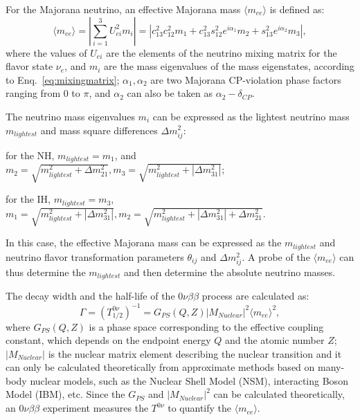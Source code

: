 For the Majorana neutrino, an effective Majorana mass $\langle m_{ee}\rangle$ is defined as\cite{suekane2015neutrino,zuber2020neutrino}:
\begin{equation}\label{eq:effective_nuMass}
\langle m_{ee}\rangle = |\sum_{i=1}^3 U^2_{ei}m_i|= |c^2_{13}c^2_{12}m_1+c^2_{13}s^2_{12}e^{i\alpha_1}m_2+s^2_{13}e^{i\alpha_2}m_3|,
\end{equation}
where the values of $U_{ei}$ are the elements of the neutrino mixing matrix for the flavor state $\nu_e$, and $m_i$ are the mass eigenvalues of the mass eigenstates, according to Enq.~\ref{eq:mixingmatrix}; $\alpha_1,\alpha_2$ are two Majorana CP-violation phase factors ranging from 0 to $\pi$, and $\alpha_2$ can also be taken as $\alpha_2-\delta_{CP}$.

The neutrino mass eigenvalues $m_i$ can be expressed as the lightest neutrino mass $m_{lightest}$ and mass square differences $\Delta m^2_{ij}$\cite{suekane2015neutrino}:

for the NH, $m_{lightest}=m_1$, and $m_2=\sqrt{m_{lightest}^2+\Delta m^2_{21}}, m_3 = \sqrt{m_{lightest}^2+|\Delta m^2_{31}|}$;

for the IH, $m_{lightest}=m_3$, $m_1=\sqrt{m_{lightest}^2+|\Delta m^2_{31}|}, m_2=\sqrt{m_{lightest}^2+|\Delta m^2_{31}|+\Delta m^2_{21}}$.

In this case, the effective Majorana mass can be expressed as the $m_{lightest}$ and neutrino flavor transformation parameters $\theta_{ij}$ and $\Delta m^2_{ij}$. A probe of the $\langle m_{ee}\rangle$ can thus determine the $m_{lightest}$ and then determine the absolute neutrino masses. 

The decay width and the half-life of the $0\nu\beta\beta$ process are calculated as\cite{suekane2015neutrino,zuber2020neutrino}:
\begin{equation}\label{eq:decayWidth0vbb}
\Gamma=(T^{0\nu}_{1/2})^{-1} = G_{PS}(Q,Z)|M_{Nuclear}|^2\langle m_{ee}\rangle^2, 
\end{equation}
where $G_{PS}(Q,Z)$ is a phase space corresponding to the effective coupling constant, which depends on the endpoint energy $Q$ and the atomic number $Z$; $|M_{Nuclear}|$ is the nuclear matrix element describing the nuclear transition and it can only be calculated theoretically from approximate methods based on many-body nuclear models, such as the Nuclear Shell Model (NSM), interacting Boson Model (IBM), etc. Since the $G_{PS}$ and $|M_{Nuclear}|^2$ can be calculated theoretically, an $0\nu\beta\beta$ experiment measures the $T^{0\nu}$ to quantify the $\langle m_{ee}\rangle$.

